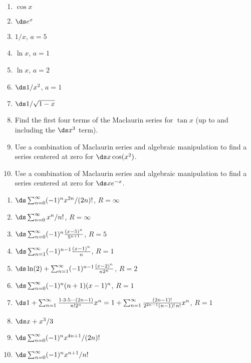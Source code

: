 \begin{enumialphparenastyle}
\begin{ex}
\begin{enumerate}
	\item $\cos x$
	\item $\ds e^x$
	\item $1/x$, $a=5$
	\item $\ln x$, $a=1$
	\item $\ln x$, $a=2$
	\item $\ds 1/x^2$, $a=1$
	\item $\ds 1/\sqrt{1-x}$
	\item Find the first four terms of the Maclaurin series for $\tan
	x$ (up to and including the $\ds x^3$ term).
	\item Use a combination of Maclaurin series and algebraic
	manipulation to find a series centered at zero for
	$\ds x\cos (x^2)$.
	\item Use a combination of Maclaurin series and algebraic
	manipulation to find a series centered at zero for
	$\ds xe^{-x}$.
\end{enumerate}
\begin{sol}
\begin{enumerate}
	\item $\ds\sum_{n=0}^\infty (-1)^n x^{2n}/(2n)!$, $R=\infty$
	\item $\ds\sum_{n=0}^\infty x^n/n!$, $R=\infty$
	\item $\ds\sum_{n=0}^\infty (-1)^n{(x-5)^n\over 5^{n+1}}$, $R=5$
	\item $\ds\sum_{n=1}^\infty (-1)^{n-1}{(x-1)^n\over n}$, $R=1$
	\item $\ds\ln(2)+\sum_{n=1}^\infty (-1)^{n-1}{(x-2)^n\over n 2^n}$, $R=2$
	\item $\ds\sum_{n=0}^\infty (-1)^n(n+1)(x-1)^n$, $R=1$
	\item $\ds1+\sum_{n=1}^\infty {1\cdot3\cdot5\cdots(2n-1)\over
		n!2^n} x^n=1+\sum_{n=1}^\infty {(2n-1)!\over 2^{2n-1}(n-1)!\,n!}x^n$, $R=1$
	\item $\ds x+x^3/3$
	\item $\ds\sum_{n=0}^\infty (-1)^n x^{4n+1}/(2n)!$
	\item $\ds\sum_{n=0}^\infty (-1)^n x^{n+1}/n!$
\end{enumerate}
\end{sol}
\end{ex}

\end{enumialphparenastyle}